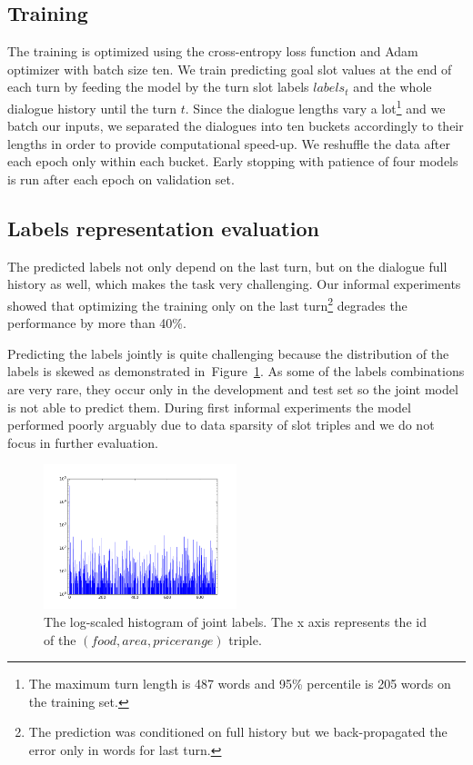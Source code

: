 \documentclass{itatnew}
\begin{document}
\subsection{Training}
\label{sec:train}
The training is optimized using the cross-entropy loss function and Adam optimizer\cite{kingma2014adam} with batch size ten.
We train predicting goal slot values at the end of each turn by feeding the model by the turn slot labels $labels_t$ and the whole dialogue history until the turn $t$.
Since the dialogue lengths vary a lot\footnote{The maximum turn length is 487 words and 95\% percentile is 205 words on the training set.} and we batch our inputs, we separated the dialogues into ten buckets accordingly to their lengths in order to provide computational speed-up. We reshuffle the data after each epoch only within each bucket.
Early stopping with patience\cite{prechelt1998early} of four models is run after each epoch on validation set.

\subsection{Labels representation evaluation}
\label{sec:eval}
The predicted labels not only depend on the last turn, but on the dialogue full history as well, which makes the task very challenging.
Our informal experiments showed that optimizing the training only on the last turn\footnote{The prediction was conditioned on full history but we back-propagated the error only in words for last turn.} degrades the performance by more than 40\%.

Predicting the labels jointly is quite challenging because the distribution of the labels is skewed as demonstrated in~Figure~\ref{fig:labels}.
As some of the labels combinations are very rare, they occur only in the development and test set so the joint model is not able to predict them.
During first informal experiments the model performed poorly arguably due to data sparsity of slot triples and we do not focus in further evaluation.

\begin{figure}
\includegraphics[width=0.5\textwidth]{dstc2_goals_joint_log_scale}
\caption{The log-scaled histogram of joint labels. The x axis represents the id of the $(food, area, pricerange)$ triple.}
\label{fig:labels}
\end{figure}
\end{document}
